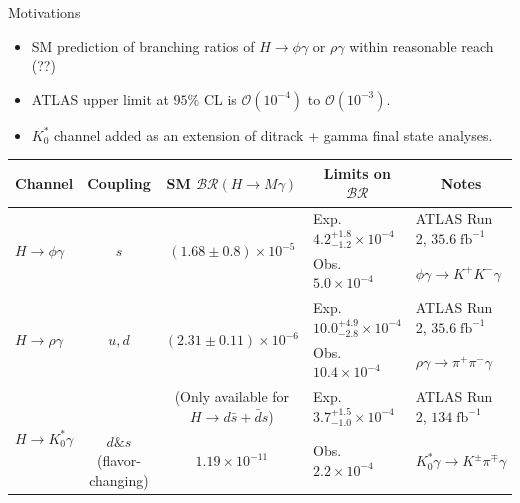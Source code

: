 \documentclass[9pt,aspectratio=1610]{beamer}
\begin{document}
\begin{frame}{Motivations}
	\begin{itemize}
		\item SM prediction of branching ratios of \(H\rightarrow \phi\gamma\) or \(\rho\gamma\) within reasonable reach (??)
		\item ATLAS upper limit at \(95\)\% CL is \(\mathcal{O}(10^{-4})\) to \(\mathcal{O}(10^{-3})\).
		\item \(K^*_0\) channel added as an extension of ditrack + gamma final state analyses.
	\end{itemize}
	\footnotesize
	\begin{table}[!ht]
		\centering
		\begin{tabular}[t]{|l|c|c|l|l|}
			\hline
			\multicolumn{1}{|c|}{\cellcolor{lightgray}\small Channel} & \cellcolor{lightgray}\small Coupling & \cellcolor{lightgray}\small SM \(\mathcal{BR}(H\rightarrow M\gamma)\) & \multicolumn{1}{c|}{\cellcolor{lightgray}\small Limits on \(\mathcal{BR}\)} & \multicolumn{1}{c|}{\cellcolor{lightgray}\small Notes} \\
			\hline
			
			\multirow{2}{*}{\(H\rightarrow \phi\gamma\)} & \multirow{2}{*}{\(s\)} & \multirow{2}{*}{\((1.68\pm0.8) \times 10^{-5}\)\cite{K_nig_2015}} & Exp. \(4.2^{+1.8}_{-1.2}\times10^{-4}\) & ATLAS Run 2, \(35.6\;\textrm{fb}^{-1}\) \\ & & & Obs. \(5.0\times10^{-4}\) \cite{ATLAS_rhophigamma2023} & \(\phi\gamma\rightarrow K^+K^-\gamma\)\\
			\hline
			
			\multirow{2}{*}{\(H\rightarrow \rho\gamma\)} & \multirow{2}{*}{\(u, d\)} & \multirow{2}{*}{\((2.31\pm0.11) \times 10^{-6}\)\cite{K_nig_2015}} & Exp. \(10.0^{+4.9}_{-2.8}\times10^{-4}\) & ATLAS Run 2, \(35.6\;\textrm{fb}^{-1}\) \\ & & & Obs. \(10.4\times10^{-4}\) \cite{ATLAS_rhophigamma2023} & \(\rho\gamma\rightarrow \pi^+\pi^-\gamma\) \\
			\hline
			
			\multirow{2}{*}{\(H\rightarrow K^*_0\gamma\)} & & \tiny (Only available for \(H\rightarrow d\bar{s} + \bar{d}s\)) & Exp. \(3.7^{+1.5}_{-1.0}\times10^{-4}\) & ATLAS Run 2, \(134\;\textrm{fb}^{-1}\) \\ & \multirow{-2}{*}{\(d\&s\) (flavor-changing)} & \(1.19\times10^{-11}\) \cite{Aranda_2020} & Obs. \(2.2\times10^{-4}\) \cite{ATLAS_omegaK0stargamma} & \(K^*_0\gamma\rightarrow K^\pm\pi^\mp\gamma\) \\
			\hline
		\end{tabular}
		\label{tab:Higgs_rare_decays}
	\end{table}
\end{frame}
\end{document}

